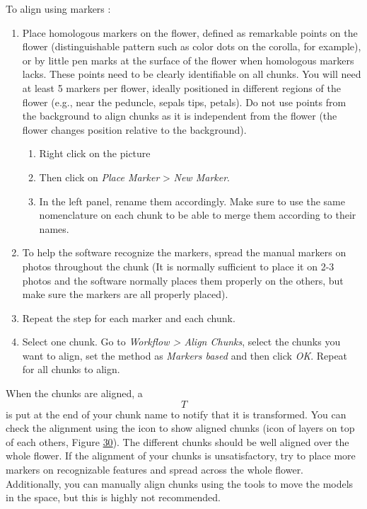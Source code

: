 \documentclass[
]{book}
\begin{document}
To align using markers :

\begin{enumerate}
\def\labelenumi{\arabic{enumi}.}
\item
  Place homologous markers on the flower, defined as remarkable points
  on the flower (distinguishable pattern such as color dots on the
  corolla, for example), or by little pen marks at the surface of the
  flower when homologous markers lacks. These points need to be
  clearly identifiable on all chunks. You will need at least 5 markers
  per flower, ideally positioned in different regions of the flower
  (e.g., near the peduncle, sepals tips, petals). Do not use points
  from the background to align chunks as it is independent from the
  flower (the flower changes position relative to the background).

  \begin{enumerate}
  \def\labelenumii{\arabic{enumii}.}
  \item
    Right click on the picture
  \item
    Then click on \emph{Place Marker} \textgreater{} \emph{New Marker}.
  \item
    In the left panel, rename them accordingly. Make sure to use the
    same nomenclature on each chunk to be able to merge them
    according to their names.
  \end{enumerate}
\item
  To help the software recognize the markers, spread the manual
  markers on photos throughout the chunk (It is normally sufficient to
  place it on 2-3 photos and the software normally places them
  properly on the others, but make sure the markers are all properly
  placed).
\item
  Repeat the step for each marker and each chunk.
\item
  Select one chunk. Go to \emph{Workflow \textgreater{} Align Chunks}, select the
  chunks you want to align, set the method as \emph{Markers based} and then
  click \emph{OK}. Repeat for all chunks to align.
\end{enumerate}

When the chunks are aligned, a \[T\] is put at the end of your chunk
name to notify that it is transformed. You can check the alignment using
the icon to show aligned chunks (icon of layers on top of each others,
Figure \protect\hyperlink{show_aligned_chunk}{30}). The different chunks should be well
aligned over the whole flower. If the alignment of your chunks is
unsatisfactory, try to place more markers on recognizable features and
spread across the whole flower. Additionally, you can manually align
chunks using the tools to move the models in the space, but this is
highly not recommended.
\end{document}

